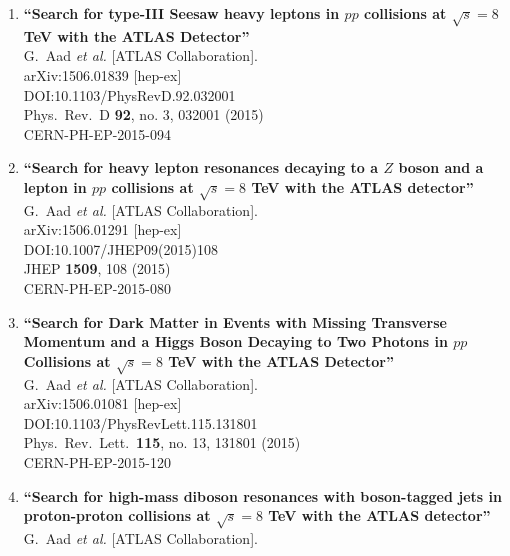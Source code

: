 \documentclass{article}
\begin{document}
\begin{enumerate}
\item%
{\bf ``Search for type-III Seesaw heavy leptons in $pp$ collisions at $\sqrt{s}= 8$ TeV with the ATLAS Detector''}
  \\{}G.~Aad {\it et al.} [ATLAS Collaboration].
  \\{}arXiv:1506.01839 [hep-ex]
  \\{}DOI:10.1103/PhysRevD.92.032001
  \\{}Phys.\ Rev.\ D {\bf 92}, no. 3, 032001 (2015)
  \\{}CERN-PH-EP-2015-094
\item%
{\bf ``Search for heavy lepton resonances decaying to a $Z$ boson and a lepton in $pp$ collisions at $\sqrt{s}=8$ TeV with the ATLAS detector''}
  \\{}G.~Aad {\it et al.} [ATLAS Collaboration].
  \\{}arXiv:1506.01291 [hep-ex]
  \\{}DOI:10.1007/JHEP09(2015)108
  \\{}JHEP {\bf 1509}, 108 (2015)
  \\{}CERN-PH-EP-2015-080
\item%
{\bf ``Search for Dark Matter in Events with Missing Transverse Momentum and a Higgs Boson Decaying to Two Photons in $pp$ Collisions at $\sqrt{s}=8$ TeV with the ATLAS Detector''}
  \\{}G.~Aad {\it et al.} [ATLAS Collaboration].
  \\{}arXiv:1506.01081 [hep-ex]
  \\{}DOI:10.1103/PhysRevLett.115.131801
  \\{}Phys.\ Rev.\ Lett.\  {\bf 115}, no. 13, 131801 (2015)
  \\{}CERN-PH-EP-2015-120
\item%
{\bf ``Search for high-mass diboson resonances with boson-tagged jets in proton-proton collisions at $ \sqrt{s}=8 $ TeV with the ATLAS detector''}
  \\{}G.~Aad {\it et al.} [ATLAS Collaboration].

\end{enumerate}
\end{document}
